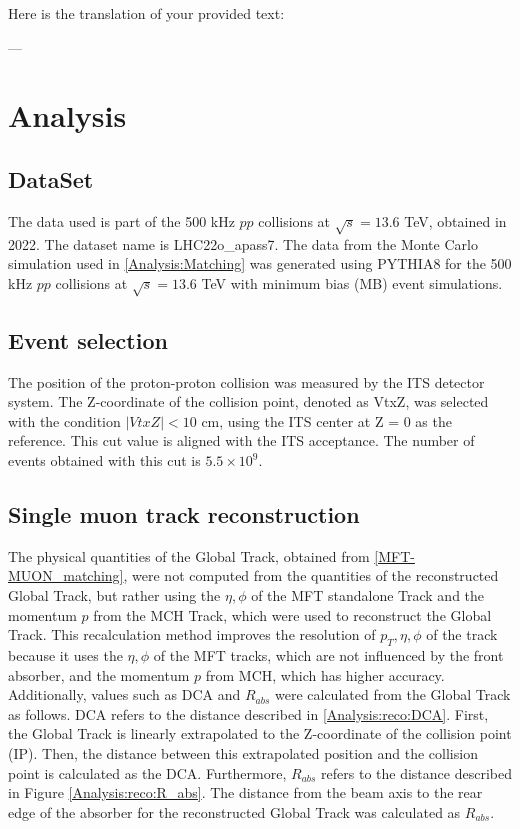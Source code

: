 Here is the translation of your provided text:

---

\newpage
\clearpage
\section{Analysis}
\label{Analysis}
    \subsection{DataSet}
    \label{DataSet}
        The data used is part of the 500 kHz $pp$ collisions at $\sqrt{s}=13.6$ TeV, obtained in 2022. The dataset name is LHC22o\_apass7. The data from the Monte Carlo simulation used in \ref{Analysis:Matching} was generated using PYTHIA8 for the 500 kHz $pp$ collisions at $\sqrt{s}=13.6$ TeV with minimum bias (MB) event simulations.
        
    \subsection{Event selection}
    \label{Event_selection}
        The position of the proton-proton collision was measured by the ITS detector system. The Z-coordinate of the collision point, denoted as VtxZ, was selected with the condition $|VtxZ| < 10$ cm, using the ITS center at Z = 0 as the reference. This cut value is aligned with the ITS acceptance. The number of events obtained with this cut is $5.5 \times 10^9$.

    \subsection{Single muon track reconstruction}
    \label{Single_reco}
        The physical quantities of the Global Track, obtained from \ref{MFT-MUON_matching}, were not computed from the quantities of the reconstructed Global Track, but rather using the $\eta, \phi$ of the MFT standalone Track and the momentum $p$ from the MCH Track, which were used to reconstruct the Global Track. This recalculation method improves the resolution of $p_T, \eta, \phi$ of the track because it uses the $\eta, \phi$ of the MFT tracks, which are not influenced by the front absorber, and the momentum $p$ from MCH, which has higher accuracy. Additionally, values such as DCA and $R_{abs}$ were calculated from the Global Track as follows. DCA refers to the distance described in \ref{Analysis:reco:DCA}. First, the Global Track is linearly extrapolated to the Z-coordinate of the collision point (IP). Then, the distance between this extrapolated position and the collision point is calculated as the DCA. Furthermore, $R_{abs}$ refers to the distance described in Figure \ref{Analysis:reco:R_abs}. The distance from the beam axis to the rear edge of the absorber for the reconstructed Global Track was calculated as $R_{abs}$.

